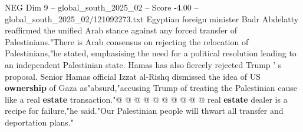 \begin{textsample}{NEG Dim 9 – global\_south\_2025\_02 – Score -4.00 – global\_south\_2025\_02/121092273.txt}
Egyptian foreign minister Badr Abdelatty reaffirmed the unified Arab stance against any forced transfer of Palestinians."There is Arab consensus on rejecting the relocation of Palestinians,"he stated, emphasising the need for a political resolution leading to an independent Palestinian state.
Hamas has also fiercely rejected Trump ' s proposal.
Senior Hamas official Izzat al-Rishq dismissed the idea of US \textbf{ownership} of Gaza as"absurd,"accusing Trump of treating the Palestinian cause like a real \textbf{estate} transaction."@ @ @ @ @ @ @ @ @ @ real \textbf{estate} dealer is a recipe for failure,"he said."Our Palestinian people will thwart all transfer and deportation plans."

\end{textsample}
